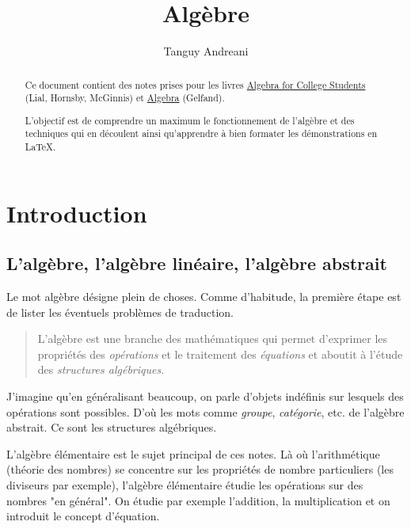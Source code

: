 \documentclass[fleqn,a4paper,nobib]{tufte-handout}
\title{Algèbre}
\author{Tanguy Andreani}
\begin{document}
\maketitle

\begin{abstract}
    Ce document contient des notes prises pour les livres
    \underline{Algebra for College Students} (Lial, Hornsby, McGinnis)
    et \underline{Algebra} (Gelfand).
    
    L'objectif est de comprendre un maximum le fonctionnement
    de l'algèbre et des techniques qui en découlent ainsi
    qu'apprendre à bien formater les démonstrations en \LaTeX.
\end{abstract}

\tableofcontents

\section{Introduction}

\subsection{L'algèbre, l'algèbre linéaire, l'algèbre abstrait}



Le mot algèbre désigne plein de choses. Comme d'habitude, la
première étape est de lister les éventuels problèmes de traduction.

\begin{quote}
    L'algèbre est une branche des mathématiques qui permet d'exprimer les
    propriétés des \textit{opérations} et le traitement des \textit{équations}
    et aboutit à l'étude des \textit{structures algébriques}.
\end{quote}

J'imagine qu'en généralisant beaucoup, on parle d'objets indéfinis
sur lesquels des opérations sont possibles. D'où les mots comme
\textit{groupe}, \textit{catégorie}, etc. de l'algèbre abstrait.
Ce sont les structures algébriques.

L'algèbre élémentaire est le sujet principal de ces notes.
Là où l'arithmétique (théorie des nombres) se concentre sur les
propriétés de nombre particuliers (les diviseurs par exemple),
l'algèbre élémentaire étudie les opérations sur des nombres "en général".
On étudie par exemple l'addition, la multiplication et
on introduit le concept d'équation.
\end{document}
